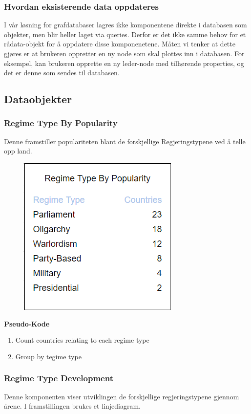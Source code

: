 \subsubsection{Hvordan eksisterende data oppdateres}
I vår løsning for grafdatabaser lagres ikke komponentene direkte i databasen som objekter, men blir 
heller laget via queries. Derfor er det ikke samme behov for et rådata-objekt for å oppdatere disse 
komponenetene. Måten vi tenker at dette gjøres er at brukeren oppretter en ny node som skal 
plottes inn i databasen. For eksempel, kan brukeren opprette en ny leder-node med tilhørende 
properties, og det er denne som sendes til databasen.

\subsection{Dataobjekter}
\subsubsection{Regime Type By Popularity}
Denne framstiller populariteten blant de forskjellige Regjeringstypene ved å telle opp land.

\FigureCounter
\begin{figure}[H]
  \includegraphics[scale=0.5]{images/milepael4/regimeTypeByPopularity.png}
\end{figure}

\textbf{Pseudo-Kode}
\begin{enumerate}
  \item Count countries relating to each regime type
  \item Group by tegime type
\end{enumerate}

\subsubsection{Regime Type Development}
Denne komponenten viser utviklingen de forskjellige regjeringstypene gjennom årene. I 
framstillingen brukes et linjediagram.


